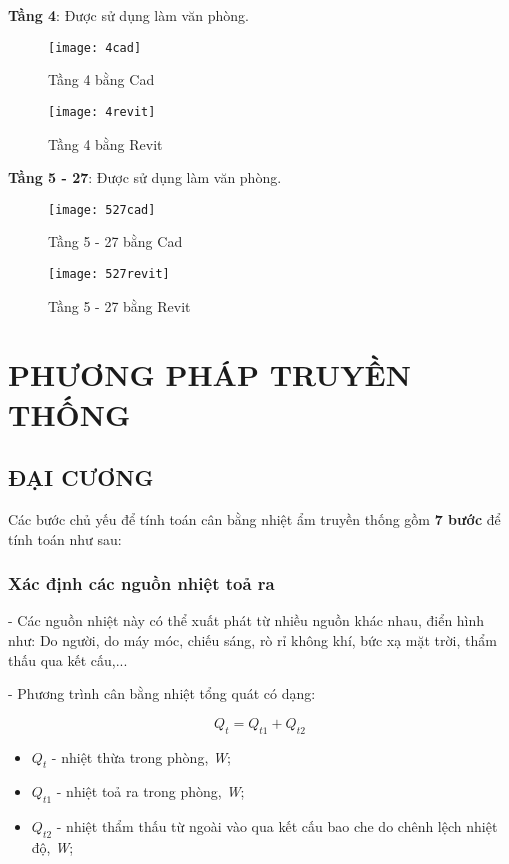 \newpage
\textbf{Tầng 4}: Được sử dụng làm văn phòng.

\begin{figure}[H]
  \centering
  \texttt{[image: 4cad]}
  \caption{Tầng 4 bằng Cad}
  \label{4cad}
\end{figure}

\begin{figure}[H]
  \centering
  \texttt{[image: 4revit]}
  \caption{Tầng 4 bằng Revit}
  \label{4revit}
\end{figure} 

\newpage
\textbf{Tầng 5 - 27}: Được sử dụng làm văn phòng.

\begin{figure}[H]
  \centering
  \texttt{[image: 527cad]}
  \caption{Tầng 5 - 27 bằng Cad}
  \label{527cad}
\end{figure}

\begin{figure}[H]
  \centering
  \texttt{[image: 527revit]}
  \caption{Tầng 5 - 27 bằng Revit}
  \label{527revit}
\end{figure} 

\section{PHƯƠNG PHÁP TRUYỀN THỐNG}
\subsection{ĐẠI CƯƠNG}
Các bước chủ yếu để tính toán cân bằng nhiệt ẩm truyền thống gồm \textbf{7 bước} để tính toán như sau:
\subsubsection{Xác định các nguồn nhiệt toả ra}
- Các nguồn nhiệt này có thể xuất phát từ nhiều nguồn khác nhau, điển hình như: Do người, do máy móc, chiếu sáng, rò rỉ không khí, bức xạ mặt trời, thẩm thấu qua kết cấu,...

- Phương trình cân bằng nhiệt tổng quát có dạng:

\begin{equation}
	Q_{t} = Q_{t1} + Q_{t2}
\end{equation}

\begin{itemize}[leftmargin = 3cm, label = $\star$]
	\item $Q_{t}$ - nhiệt thừa trong phòng, \textit{W};
	\item $Q_{t1}$ - nhiệt toả ra trong phòng, \textit{W};
	\item $Q_{t2}$ - nhiệt thẩm thấu từ ngoài vào qua kết cấu bao che do chênh lệch nhiệt độ, \textit{W};
\end{itemize}


